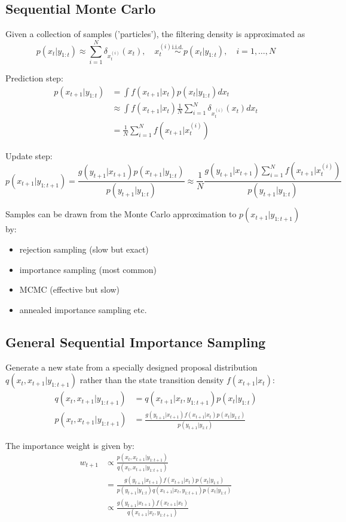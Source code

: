 \documentclass[12pt]{article}
\begin{document}
\subsection*{Sequential Monte Carlo}
Given a collection of samples ('particles'), the filtering density is approximated as 
$$
p(x_t | y_{1:t}) \approx \sum_{i=1}^N \delta_{x_t^{(i)}}(x_t), \quad x_t^{(i)} \overset{\text{i.i.d.}}{\sim} p(x_t | y_{1:t}), \quad i = 1, \dots, N
$$

Prediction step:
\begin{align*}
p(x_{t+1} | y_{1:t}) &= \int f(x_{t+1} | x_t) p(x_t | y_{1:t}) dx_t \\
&\approx \int f(x_{t+1} | x_t) \frac{1}{N} \sum_{i=1}^N\delta_{x_t^{(i)}}(x_t) dx_t \\
&= \frac{1}{N} \sum_{i=1}^N f(x_{t+1} | x_t^{(i)})
\end{align*}

Update step:
$$
p(x_{t+1} | y_{1:t+1})  = \frac{g(y_{t+1} | x_{t+1}) p(x_{t+1} | y_{1:t})}{p(y_{t+1} | y_{1:t})} \approx \frac{1}{N} \frac{g(y_{t+1} | x_{t+1}) \sum_{i=1}^N f(x_{t+1} | x_t^{(i)})}{p(y_{t+1} | y_{1:t})}
$$

Samples can be drawn from the Monte Carlo approximation to $p(x_{t+1} | y_{1:t+1})$ by:
\begin{itemize}
    \item rejection sampling (slow but exact)
    \item importance sampling (most common)
    \item MCMC (effective but slow)
    \item annealed importance sampling etc.
\end{itemize}

\subsection*{General Sequential Importance Sampling}
Generate a new state from a specially designed proposal distribution $q(x_t,x_{t+1} | y_{1:t+1})$ rather than the state transition density $f(x_{t+1} | x_t)$:
\begin{align*}
q(x_t, x_{t+1} | y_{1:t+1}) &= q(x_{t+1} | x_t, y_{1:t+1}) p(x_t | y_{1:t}) \\
p(x_t, x_{t+1} | y_{1:t+1}) &= \frac{g(y_{t+1} | x_{t+1}) f(x_{t+1} | x_t) p(x_t | y_{1:t})}{p(y_{t+1} | y_{1:t})}
\end{align*}

The importance weight is given by:
\begin{align*}
w_{t+1} &\propto \frac{p(x_t, x_{t+1} | y_{1:t+1})}{q(x_t, x_{t+1} | y_{1:t+1})} \\
&= \frac{g(y_{t+1} | x_{t+1}) f(x_{t+1} | x_t) p(x_t | y_{1:t})}{p(y_{t+1} | y_{1:t}) q(x_{t+1} | x_t, y_{1:t+1}) p(x_t | y_{1:t})} \\
&\propto \frac{g(y_{t+1} | x_{t+1}) f(x_{t+1} | x_t)}{q(x_{t+1} | x_t, y_{1:t+1})}
\end{align*}
\end{document}
